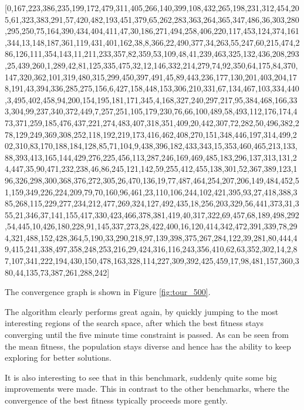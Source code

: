 \documentclass[a4paper,10pt]{article}
\begin{document}
[0,167,223,386,235,199,172,479,311,405,266,140,399,108,432,265,198,231,312,454,205,61,323,383,291,57,420,482,193,451,379,65,262,283,363,264,365,347,486,36,303,280,295,250,75,164,390,434,404,411,47,30,186,271,494,258,406,220,117,453,124,374,161,344,13,148,187,361,119,431,401,162,38,8,366,22,490,377,34,263,55,247,60,215,474,286,126,111,354,143,11,211,233,357,82,359,53,109,48,41,239,463,325,132,436,208,293,25,439,260,1,289,42,81,125,335,475,32,12,146,332,214,279,74,92,350,64,175,84,370,147,320,362,101,319,480,315,299,450,397,491,45,89,443,236,177,130,201,403,204,178,191,43,394,336,285,275,156,6,427,158,448,153,306,210,331,67,134,467,103,334,440,3,495,402,458,94,200,154,195,181,171,345,4,168,327,240,297,217,95,384,468,166,333,304,99,237,340,372,449,7,257,251,105,179,230,76,66,100,489,58,493,112,176,174,473,371,259,185,476,437,221,274,483,407,318,351,409,20,442,307,72,282,50,496,382,278,129,249,369,308,252,118,192,219,173,416,462,408,270,151,348,446,197,314,499,202,310,83,170,188,184,128,85,71,104,9,438,396,182,433,343,15,353,460,465,213,133,88,393,413,165,144,429,276,225,456,113,287,246,169,469,485,183,296,137,313,131,24,447,35,90,471,232,238,46,86,245,121,142,59,255,412,455,138,301,52,367,389,123,196,326,298,300,368,376,272,305,26,470,136,19,77,487,464,254,207,206,149,484,452,51,159,349,226,224,209,79,70,160,96,461,23,110,106,244,102,421,395,93,27,418,388,385,268,115,229,277,234,212,477,269,324,127,492,435,18,256,203,329,56,441,373,31,355,21,346,37,141,155,417,330,423,466,378,381,419,40,317,322,69,457,68,189,498,292,54,445,10,426,180,228,91,145,337,273,28,422,400,16,120,414,342,472,391,339,78,294,321,488,152,428,364,5,190,33,290,218,97,139,398,375,267,284,122,39,281,80,444,49,415,241,338,497,358,248,253,216,29,424,316,116,243,356,410,62,63,352,302,14,2,87,107,341,222,194,430,150,478,163,328,114,227,309,392,425,459,17,98,481,157,360,380,44,135,73,387,261,288,242]

The convergence graph is shown in Figure \ref{fig:tour_500}.

The algorithm clearly performs great again, by quickly jumping to the most interesting regions of the search space, after which the best fitness stays converging until the five minute time constraint is passed. As can be seen from the mean fitness, the population stays diverse and hence has the ability to keep exploring for better solutions.

It is also interesting to see that in this benchmark, suddenly quite some big improvements were made. This in contrast to the other benchmarks, where the convergence of the best fitness typically proceeds more gently.
\end{document}

